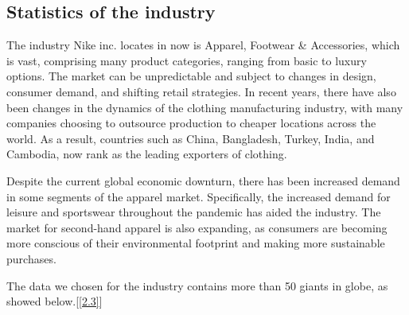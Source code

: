\documentclass[a4paper, 12pt]{report}
\begin{document}
\subsection{Statistics of the industry}
The industry Nike inc. locates in now is Apparel, Footwear & Accessories, which is vast, comprising many product categories, ranging from basic to luxury options. The market can be unpredictable and subject to changes in design, consumer demand, and shifting retail strategies. In recent years, there have also been changes in the dynamics of the clothing manufacturing industry, with many companies choosing to outsource production to cheaper locations across the world. As a result, countries such as China, Bangladesh, Turkey, India, and Cambodia, now rank as the leading exporters of clothing.\par
Despite the current global economic downturn, there has been increased demand in some segments of the apparel market. Specifically, the increased demand for leisure and sportswear throughout the pandemic has aided the industry. The market for second-hand apparel is also expanding, as consumers are becoming more conscious of their environmental footprint and making more sustainable purchases.\par
The data we chosen for the industry contains more than 50 giants in globe, as showed below.[\ref{2.3}]
\end{document}
